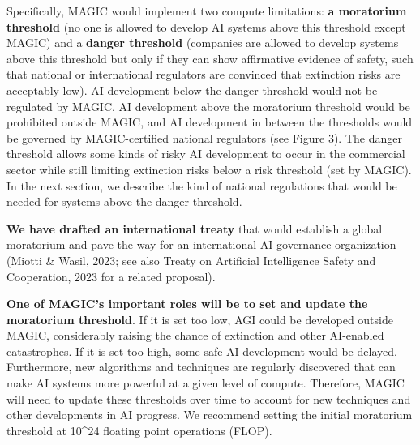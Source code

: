 \documentclass[12pt,a4paper]{article}
\begin{document}
Specifically, MAGIC would implement two compute limitations: \textbf{a moratorium threshold} (no one is allowed to develop AI systems above this threshold except MAGIC) and a \textbf{danger threshold} (companies are allowed to develop systems above this threshold but only if they can show affirmative evidence of safety, such that national or international regulators are convinced that extinction risks are acceptably low). AI development below the danger threshold would not be regulated by MAGIC, AI development above the moratorium threshold would be prohibited outside MAGIC, and AI development in between the thresholds would be governed by MAGIC-certified national regulators (see Figure 3). The danger threshold allows some kinds of risky AI development to occur in the commercial sector while still limiting extinction risks below a risk threshold (set by MAGIC). In the next section, we describe the kind of national regulations that would be needed for systems above the danger threshold.

\textbf{We have drafted an international treaty} that would establish a global moratorium and pave the way for an international AI governance organization (Miotti \& Wasil, 2023; see also Treaty on Artificial Intelligence Safety and Cooperation, 2023 for a related proposal).

\textbf{One of MAGIC's important roles will be to set and update the moratorium threshold}. If it is set too low, AGI could be developed outside MAGIC, considerably raising the chance of extinction and other AI-enabled catastrophes. If it is set too high, some safe AI development would be delayed. Furthermore, new algorithms and techniques are regularly discovered that can make AI systems more powerful at a given level of compute. Therefore, MAGIC will need to update these thresholds over time to account for new techniques and other developments in AI progress. We recommend setting the initial moratorium threshold at 10\^{}24 floating point operations (FLOP).
\end{document}
